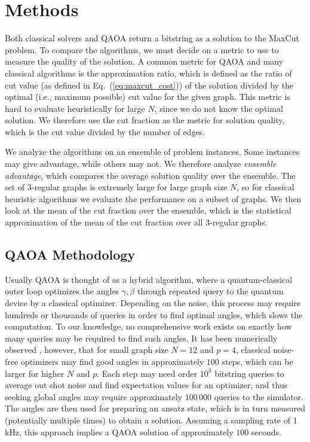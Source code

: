 \section{Methods}\label{sec:methodology}

Both classical solvers and QAOA return a bitstring as a solution to the MaxCut problem. To compare the algorithms,
we must decide on a metric to use to measure the quality of the solution. A common metric for QAOA and many classical algorithms is the approximation ratio, which is defined as the ratio of cut value (as defined in Eq.~(\ref{eq:maxcut_cost})) of the solution divided by the optimal (i.e., maximum possible) cut value for the given graph.
This metric is hard to evaluate heuristically for large $N$, since we do not know the optimal solution. We therefore use the cut fraction as the metric for solution quality, which is the cut value divided by the number of edges.

We analyze the algorithms on an ensemble of problem instances. Some instances may give advantage, while others may not. We 
therefore analyze \emph{ensemble advantage},
which compares the average solution quality over the ensemble.
The set of 3-regular graphs is extremely large for large graph size $N$, so for classical heuristic algorithms we evaluate the performance on a subset of graphs.
We then look at the mean of the cut fraction over the ensemble, which is the statistical approximation of the mean of the cut fraction over all 3-regular graphs.

\subsection{QAOA Methodology}


Usually  QAOA is thought of as a hybrid algorithm, where a quantum-classical outer loop optimizes the angles $\gamma,\beta$ through repeated query to the quantum device by a classical optimizer. Depending on the noise, this process may require hundreds or thousands of queries in order to find optimal angles, which slows the computation. To our knowledge,  no comprehensive work exists on exactly how many queries may be required to find such angles. It has been numerically observed \cite{Shaydulin_2019,Zhou2020}, however, that for small graph size $N=12$ and $p=4$, classical noise-free optimizers may find good angles in approximately $100$ steps, which can be larger for higher $N$ and $p$. Each step may need order $10^3$  bitstring queries to average out shot noise and find expectation values for an optimizer, and thus seeking global angles may require approximately $100\,000$ queries to the simulator.
The angles are then used for preparing an ansatz state, which is in turn measured (potentially multiple times) to obtain a solution.
Assuming a sampling rate of 1 kHz, this approach implies a QAOA solution of approximately  $100$ seconds.


